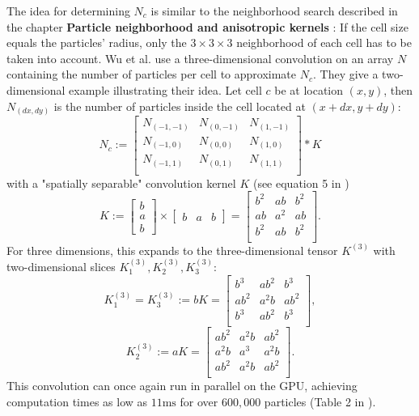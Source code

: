 The idea for determining $N_c$ is similar to the neighborhood search described in the chapter \textbf{Particle neighborhood and anisotropic kernels }: If the cell size equals the particles' radius, only the $3 \times 3 \times 3$ neighborhood of each cell has to be taken into account. Wu et al. use a three-dimensional convolution on an array $N$ containing the number of particles per cell to approximate $N_c$. They give a two-dimensional example illustrating their idea. Let cell $c$ be at location $(x, y)$, then $N_{(dx,dy)}$ is the number of particles inside the cell located at $(x + dx, y + dy)$:
\[
N_c :=
\begin{bmatrix}
  N_{(-1,-1)} & N_{(0,-1)} & N_{(1,-1)} \\
  N_{(-1,0)} & N_{(0,0)} & N_{(1,0)} \\
  N_{(-1,1)} & N_{(0,1)} & N_{(1,1)} \\
\end{bmatrix}
* K
\]
with a "spatially separable" convolution kernel $K$ (see equation 5 in \cite{Wu:2022})
\[
K :=
\begin{bmatrix} b \\ a \\ b \end{bmatrix} \times
\begin{bmatrix} b & a & b \end{bmatrix} =
\begin{bmatrix}
b^2 & ab & b^2 \\
ab & a^2 & ab \\
b^2 & ab & b^2 \\
\end{bmatrix}
.
\]
For three dimensions, this expands to the three-dimensional tensor $K^{(3)}$ with two-dimensional slices $K^{(3)}_1, K^{(3)}_2, K^{(3)}_3$:
\[
K^{(3)}_1 = K^{(3)}_3 := b K =
\begin{bmatrix}
b^3 & ab^2 & b^3 \\
ab^2 & a^2b & ab^2 \\
b^3 & ab^2 & b^3 \\
\end{bmatrix},
\]
\[
K^{(3)}_2 := a K =
\begin{bmatrix}
ab^2 & a^2b & ab^2 \\
a^2b & a^3 & a^2b \\
ab^2 & a^2b & ab^2 \\
\end{bmatrix}.
\]
This convolution can once again run in parallel on the GPU, achieving computation times as low as $11\text{ms}$ for over $600,000$ particles (Table 2 in \cite{Wu:2022}).

